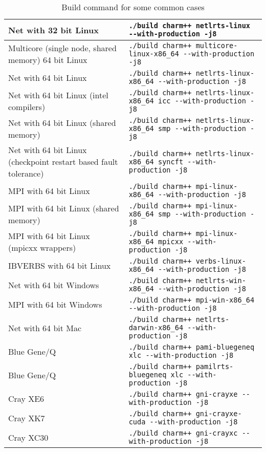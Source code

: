 \begin{table}[ht]
\begin{tabular}{|p{6cm}|p{9cm}|}
\hline
Net with 32 bit Linux & \verb|./build charm++ netlrts-linux --with-production -j8|
\\\hline
Multicore (single node, shared memory) 64 bit Linux & \verb|./build charm++ multicore-linux-x86_64 --with-production -j8|
\\\hline
Net with 64 bit Linux & \verb|./build charm++ netlrts-linux-x86_64 --with-production -j8|
\\\hline
Net with 64 bit Linux (intel compilers) & \verb|./build charm++ netlrts-linux-x86_64 icc --with-production -j8|
\\\hline
Net with 64 bit Linux (shared memory) & \verb|./build charm++ netlrts-linux-x86_64 smp --with-production -j8|
\\\hline
Net with 64 bit Linux (checkpoint restart based fault tolerance) & \verb|./build charm++ netlrts-linux-x86_64 syncft --with-production -j8|
\\\hline
MPI with 64 bit Linux & \verb|./build charm++ mpi-linux-x86_64 --with-production -j8|
\\\hline
MPI with 64 bit Linux (shared memory) & \verb|./build charm++ mpi-linux-x86_64 smp --with-production -j8|
\\\hline
MPI with 64 bit Linux (mpicxx wrappers) & \verb|./build charm++ mpi-linux-x86_64 mpicxx --with-production -j8|
\\\hline
IBVERBS with 64 bit Linux & \verb|./build charm++ verbs-linux-x86_64 --with-production -j8|
\\\hline
Net with 64 bit Windows & \verb|./build charm++ netlrts-win-x86_64 --with-production -j8|
\\\hline
MPI with 64 bit Windows & \verb|./build charm++ mpi-win-x86_64 --with-production -j8|
\\\hline
Net with 64 bit Mac & \verb|./build charm++ netlrts-darwin-x86_64 --with-production -j8|
\\\hline
Blue Gene/Q & \verb|./build charm++ pami-bluegeneq xlc --with-production -j8|
\\\hline
Blue Gene/Q & \verb|./build charm++ pamilrts-bluegeneq xlc --with-production -j8|
\\\hline
Cray XE6 & \verb|./build charm++ gni-crayxe --with-production -j8|
\\\hline
Cray XK7 & \verb|./build charm++ gni-crayxe-cuda --with-production -j8|
\\\hline
Cray XC30 & \verb|./build charm++ gni-crayxc --with-production -j8|
\\\hline
\end{tabular}
\caption{Build command for some common cases}
\label{tab:buildlist}
\end{table}

